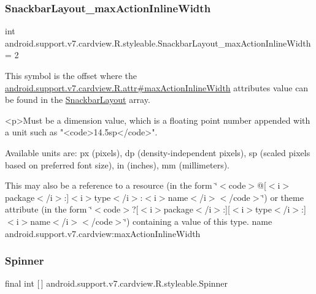 \subsubsection{\texorpdfstring{Snackbar\+Layout\+\_\+max\+Action\+Inline\+Width}{SnackbarLayout\_maxActionInlineWidth}}
{\footnotesize\ttfamily int android.\+support.\+v7.\+cardview.\+R.\+styleable.\+Snackbar\+Layout\+\_\+max\+Action\+Inline\+Width = 2\hspace{0.3cm}{\ttfamily [static]}}

This symbol is the offset where the \hyperlink{classandroid_1_1support_1_1v7_1_1cardview_1_1R_1_1attr_a23452c6aa2d34fcffde5be3a48f5723e}{android.\+support.\+v7.\+cardview.\+R.\+attr\#max\+Action\+Inline\+Width} attribute\textquotesingle{}s value can be found in the \hyperlink{classandroid_1_1support_1_1v7_1_1cardview_1_1R_1_1styleable_aab664bb57daef291febbbab9c49f8fbf}{Snackbar\+Layout} array.

\begin{DoxyVerb}      <p>Must be a dimension value, which is a floating point number appended with a unit such as "<code>14.5sp</code>".
\end{DoxyVerb}
 Available units are\+: px (pixels), dp (density-\/independent pixels), sp (scaled pixels based on preferred font size), in (inches), mm (millimeters). 

This may also be a reference to a resource (in the form \char`\"{}$<$code$>$@\mbox{[}$<$i$>$package$<$/i$>$\+:\mbox{]}$<$i$>$type$<$/i$>$\+:$<$i$>$name$<$/i$>$$<$/code$>$\char`\"{}) or theme attribute (in the form \char`\"{}$<$code$>$?\mbox{[}$<$i$>$package$<$/i$>$\+:\mbox{]}\mbox{[}$<$i$>$type$<$/i$>$\+:\mbox{]}$<$i$>$name$<$/i$>$$<$/code$>$\char`\"{}) containing a value of this type.  name android.\+support.\+v7.\+cardview\+:max\+Action\+Inline\+Width \mbox{\label{classandroid_1_1support_1_1v7_1_1cardview_1_1R_1_1styleable_a84bb9d44bbc6f8ef3357f2510af054d5}} 
\subsubsection{\texorpdfstring{Spinner}{Spinner}}
{\footnotesize\ttfamily final int \mbox{[}$\,$\mbox{]} android.\+support.\+v7.\+cardview.\+R.\+styleable.\+Spinner\hspace{0.3cm}{\ttfamily [static]}}

